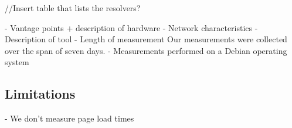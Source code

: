 //Insert table that lists the resolvers?

- Vantage points + description of hardware
- Network characteristics
- Description of tool
- Length of measurement
Our measurements were collected over the span of seven days. 
- Measurements performed on a Debian operating system 

\subsection{Limitations}
	- We don't measure page load times 	